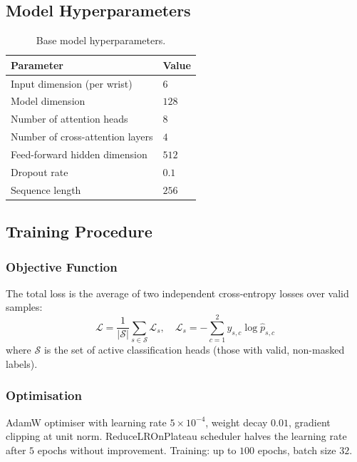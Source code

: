 \documentclass[conference]{IEEEtran}
\begin{document}
\subsection{Model Hyperparameters}

\begin{table}[H]
\centering
\caption{Base model hyperparameters.}
\label{tab:hyperparams}
\begin{tabular}{ll}
\toprule
\textbf{Parameter} & \textbf{Value} \\
\midrule
Input dimension (per wrist)     & $6$   \\
Model dimension                 & $128$ \\
Number of attention heads        & $8$   \\
Number of cross-attention layers & $4$   \\
Feed-forward hidden dimension   & $512$ \\
Dropout rate                     & $0.1$ \\
Sequence length                  & $256$ \\
\bottomrule
\end{tabular}
\end{table}

\subsection{Training Procedure}

\subsubsection{Objective Function}
The total loss is the average of two independent cross-entropy losses over valid samples:
\begin{equation}
\mathcal{L} = \frac{1}{|\mathcal{S}|} \sum_{s \in \mathcal{S}} \mathcal{L}_s, \quad
\mathcal{L}_s = -\sum_{c=1}^{2} y_{s,c} \log \hat{p}_{s,c}
\end{equation}
where $\mathcal{S}$ is the set of active classification heads (those with valid, non-masked labels).

\subsubsection{Optimisation}
AdamW optimiser with learning rate $5 \times 10^{-4}$, weight decay $0.01$, gradient clipping at unit norm. ReduceLROnPlateau scheduler halves the learning rate after $5$ epochs without improvement. Training: up to $100$ epochs, batch size $32$.
\end{document}
